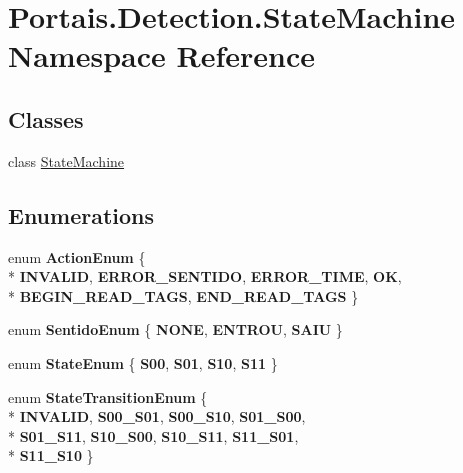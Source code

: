 \hypertarget{namespace_portais_1_1_detection_1_1_state_machine}{}\section{Portais.\+Detection.\+State\+Machine Namespace Reference}
\label{namespace_portais_1_1_detection_1_1_state_machine}
\subsection*{Classes}
\begin{DoxyCompactItemize}
\item 
class \hyperlink{class_portais_1_1_detection_1_1_state_machine_1_1_state_machine}{State\+Machine}
\end{DoxyCompactItemize}
\subsection*{Enumerations}
\begin{DoxyCompactItemize}
\item 
enum {\bfseries Action\+Enum} \{ \\*
{\bfseries I\+N\+V\+A\+L\+ID}, 
{\bfseries E\+R\+R\+O\+R\+\_\+\+S\+E\+N\+T\+I\+DO}, 
{\bfseries E\+R\+R\+O\+R\+\_\+\+T\+I\+ME}, 
{\bfseries OK}, 
\\*
{\bfseries B\+E\+G\+I\+N\+\_\+\+R\+E\+A\+D\+\_\+\+T\+A\+GS}, 
{\bfseries E\+N\+D\+\_\+\+R\+E\+A\+D\+\_\+\+T\+A\+GS}
 \}\hypertarget{namespace_portais_1_1_detection_1_1_state_machine_a90a88d8e46e586bafea25baf64319277}{}\label{namespace_portais_1_1_detection_1_1_state_machine_a90a88d8e46e586bafea25baf64319277}

\item 
enum {\bfseries Sentido\+Enum} \{ {\bfseries N\+O\+NE}, 
{\bfseries E\+N\+T\+R\+OU}, 
{\bfseries S\+A\+IU}
 \}\hypertarget{namespace_portais_1_1_detection_1_1_state_machine_a78bac4dde1288c5078d69138d3d165c7}{}\label{namespace_portais_1_1_detection_1_1_state_machine_a78bac4dde1288c5078d69138d3d165c7}

\item 
enum {\bfseries State\+Enum} \{ {\bfseries S00}, 
{\bfseries S01}, 
{\bfseries S10}, 
{\bfseries S11}
 \}\hypertarget{namespace_portais_1_1_detection_1_1_state_machine_a772b102b71d7e1097be066420b8cb5f5}{}\label{namespace_portais_1_1_detection_1_1_state_machine_a772b102b71d7e1097be066420b8cb5f5}

\item 
enum {\bfseries State\+Transition\+Enum} \{ \\*
{\bfseries I\+N\+V\+A\+L\+ID}, 
{\bfseries S00\+\_\+\+S01}, 
{\bfseries S00\+\_\+\+S10}, 
{\bfseries S01\+\_\+\+S00}, 
\\*
{\bfseries S01\+\_\+\+S11}, 
{\bfseries S10\+\_\+\+S00}, 
{\bfseries S10\+\_\+\+S11}, 
{\bfseries S11\+\_\+\+S01}, 
\\*
{\bfseries S11\+\_\+\+S10}
 \}\hypertarget{namespace_portais_1_1_detection_1_1_state_machine_a943d51f3be29d70e26c63a3e9ac71b69}{}\label{namespace_portais_1_1_detection_1_1_state_machine_a943d51f3be29d70e26c63a3e9ac71b69}

\end{DoxyCompactItemize}
